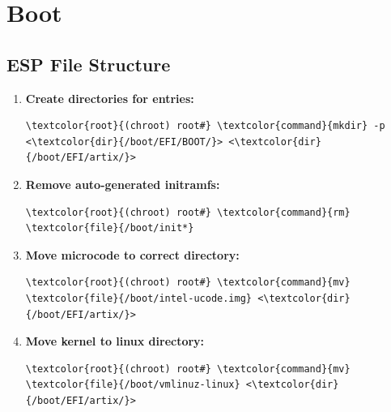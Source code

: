 \documentclass[10pt, a4paper, onecolumn, oneside, titlepage, openany]{book}
\begin{document}
\section{Boot}
\subsection{ESP File Structure}
\begin{enumerate}
    \item \textbf{Create directories for entries:}
\begin{Verbatim}[commandchars=\\\{\}]
\textcolor{root}{(chroot) root#} \textcolor{command}{mkdir} -p <\textcolor{dir}{/boot/EFI/BOOT/}> <\textcolor{dir}{/boot/EFI/artix/}>
\end{Verbatim}
    \item \textbf{Remove auto-generated initramfs:}
\begin{Verbatim}[commandchars=\\\{\}]
\textcolor{root}{(chroot) root#} \textcolor{command}{rm} \textcolor{file}{/boot/init*}
\end{Verbatim}
    \item \textbf{Move microcode to correct directory:}
\begin{Verbatim}[commandchars=\\\{\}]
\textcolor{root}{(chroot) root#} \textcolor{command}{mv} \textcolor{file}{/boot/intel-ucode.img} <\textcolor{dir}{/boot/EFI/artix/}>
\end{Verbatim}
    \item \textbf{Move kernel to linux directory:}
\begin{Verbatim}[commandchars=\\\{\}]
\textcolor{root}{(chroot) root#} \textcolor{command}{mv} \textcolor{file}{/boot/vmlinuz-linux} <\textcolor{dir}{/boot/EFI/artix/}>
\end{Verbatim}
\end{enumerate}
\end{document}
